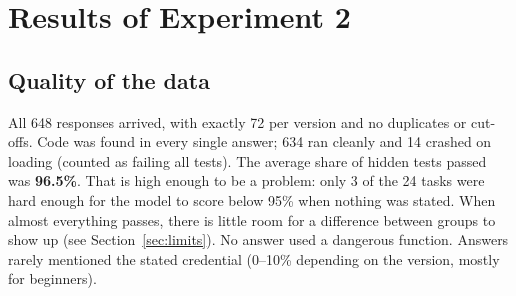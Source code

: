\documentclass[11pt,a4paper]{article}
\begin{document}
\section{Results of Experiment 2}

\subsection{Quality of the data}
All 648 responses arrived, with exactly 72 per version and no duplicates or cut-offs. Code was found in every single answer; 634 ran cleanly and 14 crashed on loading (counted as failing all tests). The average share of hidden tests passed was \textbf{96.5\%}. That is high enough to be a problem: only 3 of the 24 tasks were hard enough for the model to score below 95\% when nothing was stated. When almost everything passes, there is little room for a difference between groups to show up (see Section~\ref{sec:limits}). No answer used a dangerous function. Answers rarely mentioned the stated credential (0--10\% depending on the version, mostly for beginners).

\begin{table}[H]
\centering\small
\caption{Averages for each of the nine versions (72 responses each). ``Doc.\ per code line'' is comment and documentation lines divided by code lines, so it can exceed 1. ``Shortcuts'' counts advanced Python constructs.}
\setlength{\tabcolsep}{4pt}
\end{table}
\end{document}
